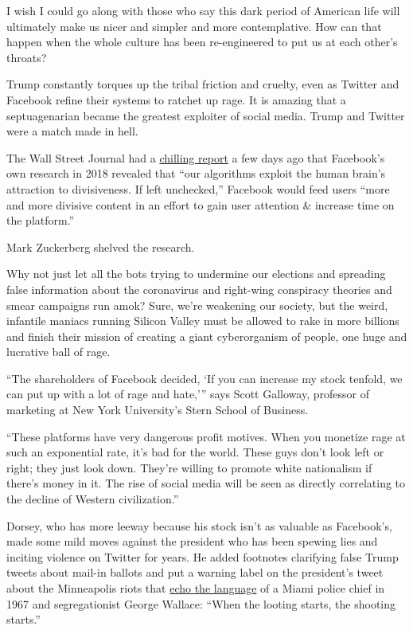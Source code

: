 I wish I could go along with those who say this dark period of American
life will ultimately make us nicer and simpler and more contemplative.
How can that happen when the whole culture has been re-engineered to put
us at each other's throats?

Trump constantly torques up the tribal friction and cruelty, even as
Twitter and Facebook refine their systems to ratchet up rage. It is
amazing that a septuagenarian became the greatest exploiter of social
media. Trump and Twitter were a match made in hell.

The Wall Street Journal had a
\href{https://www.wsj.com/articles/facebook-knows-it-encourages-division-top-executives-nixed-solutions-11590507499}{chilling
report} a few days ago that Facebook's own research in 2018 revealed
that ``our algorithms exploit the human brain's attraction to
divisiveness. If left unchecked,'' Facebook would feed users ``more and
more divisive content in an effort to gain user attention \& increase
time on the platform.''

Mark Zuckerberg shelved the research.

Why not just let all the bots trying to undermine our elections and
spreading false information about the coronavirus and right-wing
conspiracy theories and smear campaigns run amok? Sure, we're weakening
our society, but the weird, infantile maniacs running Silicon Valley
must be allowed to rake in more billions and finish their mission of
creating a giant cyberorganism of people, one huge and lucrative ball of
rage.

``The shareholders of Facebook decided, `If you can increase my stock
tenfold, we can put up with a lot of rage and hate,''' says Scott
Galloway, professor of marketing at New York University's Stern School
of Business.

``These platforms have very dangerous profit motives. When you monetize
rage at such an exponential rate, it's bad for the world. These guys
don't look left or right; they just look down. They're willing to
promote white nationalism if there's money in it. The rise of social
media will be seen as directly correlating to the decline of Western
civilization.''

Dorsey, who has more leeway because his stock isn't as valuable as
Facebook's, made some mild moves against the president who has been
spewing lies and inciting violence on Twitter for years. He added
footnotes clarifying false Trump tweets about mail-in ballots and put a
warning label on the president's tweet about the Minneapolis riots that
\href{https://www.nytimes.com/aponline/2020/05/29/us/ap-us-trump-minneapolis-death-quote-.html}{echo
the language} of a Miami police chief in 1967 and segregationist George
Wallace: ``When the looting starts, the shooting starts.''


